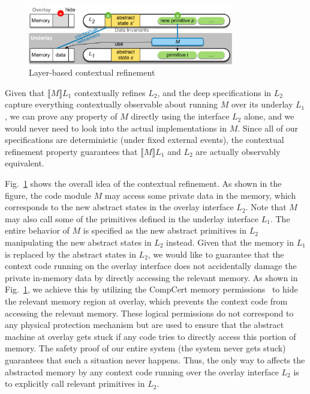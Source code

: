 \begin{figure}
\begin{center}
\includegraphics[width=0.8\textwidth]{figs/object-original}
\end{center}
\caption{Layer-based contextual refinement}
\label{fig:spec:object-original}
\end{figure}


Given that $\llbracket{}M\rrbracket{}L_1$ contextually refines $L_2$,
and the deep specifications in $L_2$ capture everything contextually observable
about running $M$ over its underlay $L_1$, we can prove any property of $M$ directly using
the interface $L_2$ alone, and we would never need to look into the actual
implementations in $M$. Since all of our specifications are deterministic
(under fixed external events), the contextual refinement property guarantees
that $\llbracket{}M\rrbracket{}L_1$ and $L_2$ are actually observably equivalent.

Fig.~\ref{fig:spec:object-original} shows the overall idea of the contextual
refinement. As shown in the figure, the code module $M$ may access some
private data in the memory, which corresponds to the new abstract states
in the overlay interface $L_2$. Note that $M$ may also call some of the
primitives defined in the underlay interface $L_1$. The entire behavior
of $M$ is specified as the new abstract primitives in $L_2$ manipulating
the new abstract states in $L_2$ instead. Given that the memory in $L_1$
is replaced by the abstract states in $L_2$, we would like to 
guarantee that the context
code running on the overlay interface does not accidentally damage the private
in-memory data by directly accessing the relevant memory. As shown in
Fig.~\ref{fig:spec:object-original}, we achieve this by utilizing the CompCert
memory permissions~\cite{leroy08} to hide the relevant memory region at overlay,
which prevents the context code from accessing the relevant memory. These
logical permissions do not correspond to any physical protection mechanism but
are used to ensure that the abstract machine at overlay gets stuck if any code
tries to directly access this portion of memory. The safety proof of our entire
system (the system never gets stuck) guarantees that such a situation never
happens. Thus, the only way to affects the abstracted memory by any context code
running over the overlay interface $L_2$ is to explicitly call relevant
primitives in $L_2$.


